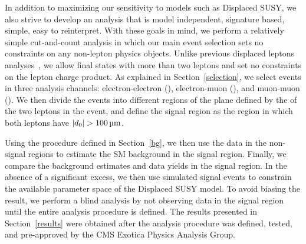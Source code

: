 In addition to maximizing our sensitivity to models such as Displaced SUSY, we also strive to develop an analysis that is model independent, signature based, simple, easy to reinterpret. With these goals in mind, we perform a relatively simple cut-and-count analysis in which our main event selection sets no constraints on any non-lepton physics objects. Unlike previous displaced leptons analyses~\cite{displaced_leptons_run1, displaced_leptons_bing}, we allow final states with more than two leptons and set no constraints on the lepton charge product. As explained in Section~\ref{selection}, we select events in three analysis channels: electron-electron (\Pe\Pe), electron-muon (\Pe\Pgm), and muon-muon (\Pgm\Pgm). We then divide the events into different regions of the plane defined by the \ad of the two leptons in the event, and define the signal region as the region in which both leptons have $\ad>\SI{100}{\um}$.

Using the procedure defined in Section~\ref{bg}, we then use the data in the non-signal regions to estimate the SM background in the signal region. Finally, we compare the background estimates and data yields in the signal region. In the absence of a significant excess, we then use simulated signal events to constrain the available parameter space of the Displaced SUSY model. To avoid biasing the result, we perform a blind analysis by not observing data in the signal region until the entire analysis procedure is defined. The results presented in Section~\ref{results} were obtained after the analysis procedure was defined, tested, and pre-approved by the CMS Exotica Physics Analysis Group.

\pagebreak